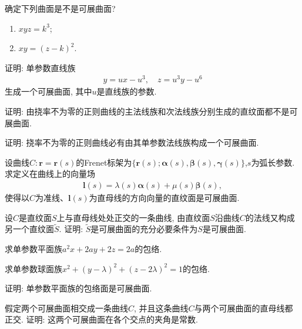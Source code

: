 \documentclass[../../main.tex]{subfiles}%
\begin{document}
\begin{example}
确定下列曲面是不是可展曲面?
\begin{enumerate}[(1)]
\item $xyz=k^3$;
\item $xy=(z-k)^2$.
\end{enumerate}
\end{example}

\begin{example}
证明: 单参数直线族
\begin{align*}
y=ux-u^3,\quad z=u^3y-u^6
\end{align*}
生成一个可展曲面, 其中$u$是直线族的参数.
\end{example}

\begin{example}
证明: 由挠率不为零的正则曲线的主法线族和次法线族分别生成的直纹面都不是可展曲面.
\end{example}

\begin{example}
证明: 挠率不为零的正则曲线必有由其单参数法线族构成一个可展曲面.
\end{example}

\begin{example}
设曲线$C:\bm{r}=\bm{r}(s)$的Frenet标架为$\{\bm{r}(s);\bm{\alpha}(s),\bm{\beta}(s),\bm{\gamma}(s)\}$,$s$为弧长参数. 求定义在曲线上的向量场
\begin{align*}
\bm{l}(s)=\lambda(s)\bm{\alpha}(s)+\mu(s)\bm{\beta}(s),
\end{align*}
使得以$C$为准线、$\bm{l}(s)$为直母线的方向向量的直纹面是可展曲面.
\end{example}

\begin{example}
设$C$是直纹面$S$上与直母线处处正交的一条曲线, 由直纹面$S$沿曲线$C$的法线又构成另一个直纹面$\tilde{S}$. 证明: $\tilde{S}$是可展曲面的充分必要条件为$S$是可展曲面.
\end{example}

\begin{example}
求单参数平面族$a^2x+2ay+2z=2a$的包络.
\end{example}

\begin{example}
求单参数球面族$x^2+(y-\lambda)^2+(z-2\lambda)^2=1$的包络.
\end{example}

\begin{example}
证明: 单参数平面族的包络面是可展曲面.
\end{example}

\begin{example}
假定两个可展曲面相交成一条曲线$C$, 并且这条曲线$C$与两个可展曲面的直母线都正交. 证明: 这两个可展曲面在各个交点的夹角是常数.
\end{example}
\end{document}
